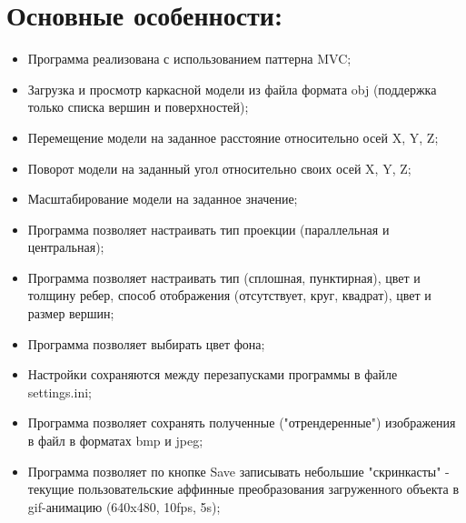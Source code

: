 \documentclass{report}
\begin{document}
\section* {\bfseries Основные особенности:}
\begin{itemize}
\item Программа реализована с использованием паттерна MVC;

\item Загрузка и просмотр каркасной модели из файла формата obj (поддержка только списка вершин и поверхностей);

\item Перемещение модели на заданное расстояние относительно осей X, Y, Z;

\item Поворот модели на заданный угол относительно своих осей X, Y, Z;

\item Масштабирование модели на заданное значение;

\item Программа позволяет настраивать тип проекции (параллельная и центральная);

\item Программа позволяет настраивать тип (сплошная, пунктирная), цвет и толщину ребер, способ отображения (отсутствует, круг, квадрат), цвет и размер вершин;

\item Программа позволяет выбирать цвет фона;

\item Настройки сохраняются между перезапусками программы в файле settings.ini;

\item Программа позволяет сохранять полученные ("отрендеренные") изображения в файл в форматах bmp и jpeg;

\item Программа позволяет по кнопке Save записывать небольшие "скринкасты" - текущие пользовательские аффинные преобразования загруженного объекта в gif-анимацию (640x480, 10fps, 5s);

\end{itemize}
\end{document}
